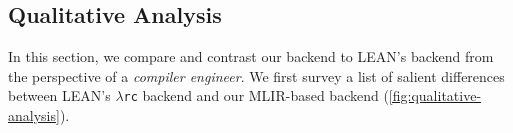 \documentclass[conference]{IEEEtran}
\newcommand{\lambdarc}{\ensuremath{\lambda}\texttt{rc}}
\begin{document}





\subsection{Qualitative Analysis}
In this section, we compare and contrast our backend to LEAN's
backend from the perspective of a \emph{compiler engineer}. We first
survey a list of salient differences between LEAN's \lambdarc{} backend
and our MLIR-based backend (\autoref{fig:qualitative-analysis}).
\end{document}
